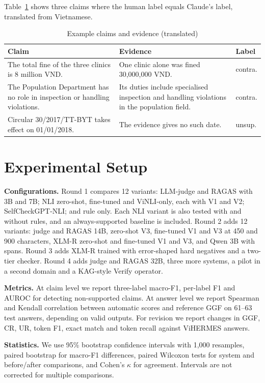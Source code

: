 \documentclass[conference]{IEEEtran}
\begin{document}
Table~\ref{tab:examples} shows three claims where the human label equals Claude's label, translated from Vietnamese.

\begin{table}[t]
\caption{Example claims and evidence (translated)}
\label{tab:examples}
\centering
\footnotesize
\begin{tabular}{p{}p{}p{}}
\toprule
Claim & Evidence & Label \\
\midrule
The total fine of the three clinics is 8 million VND. & One clinic alone was fined 30,000,000 VND. & contra. \\
The Population Department has no role in inspection or handling violations. & Its duties include specialised inspection and handling violations in the population field. & contra. \\
Circular 30/2017/TT-BYT takes effect on 01/01/2018. & The evidence gives no such date. & unsup. \\
\bottomrule
\end{tabular}
\end{table}

\section{Experimental Setup}
\textbf{Configurations.} Round 1 compares 12 variants: LLM-judge and RAGAS with 3B and 7B; NLI zero-shot, fine-tuned and ViNLI-only, each with V1 and V2; SelfCheckGPT-NLI; and rule only. Each NLI variant is also tested with and without rules, and an always-supported baseline is included. Round 2 adds 12 variants: judge and RAGAS 14B, zero-shot V3, fine-tuned V1 and V3 at 450 and 900 characters, XLM-R zero-shot and fine-tuned V1 and V3, and Qwen 3B with spans. Round 3 adds XLM-R trained with error-shaped hard negatives and a two-tier checker. Round 4 adds judge and RAGAS 32B, three more systems, a pilot in a second domain and a KAG-style Verify operator.

\textbf{Metrics.} At claim level we report three-label macro-F1, per-label F1 and AUROC for detecting non-supported claims. At answer level we report Spearman and Kendall correlation between automatic scores and reference GGF on 61--63 test answers, depending on valid outputs. For revision we report changes in GGF, CR, UR, token F1, exact match and token recall against ViHERMES answers.

\textbf{Statistics.} We use 95\% bootstrap confidence intervals with 1,000 resamples, paired bootstrap for macro-F1 differences, paired Wilcoxon tests for system and before/after comparisons, and Cohen's $\kappa$ for agreement. Intervals are not corrected for multiple comparisons.
\end{document}
